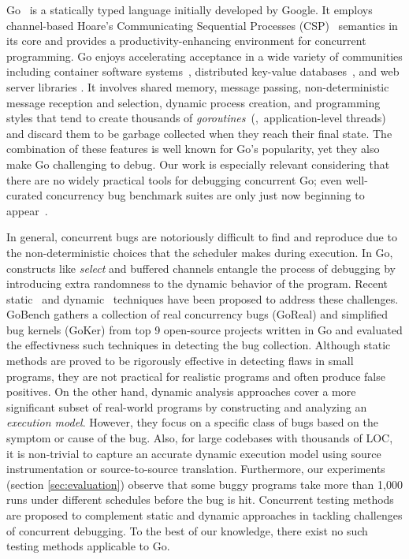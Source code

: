 Go~\cite{go} is a statically typed language initially developed by Google.
%
It employs channel-based Hoare's Communicating Sequential Processes (CSP)~\cite{hoare-csp78} semantics in its core and provides a productivity-enhancing environment for concurrent programming.
%
Go enjoys accelerating acceptance in a wide variety of
communities including container software systems~\cite{merkel2014docker,kubernetes},  distributed key-value databases~\cite{etcd,cockroachdb-sigmod20}, and web server libraries \cite{grpc}.
%
It involves shared memory, message passing, non-deterministic message reception and selection, dynamic process creation, and programming styles that tend to create thousands of \textit{goroutines}~(\ie,~application-level threads) and discard them to be garbage collected when they reach their final state.
%
The combination of these features is well known for Go's popularity, yet they also make Go challenging to debug.
%
Our work is especially relevant considering that there are no widely practical tools for debugging concurrent Go; even well-curated
concurrency bug benchmark suites are only just now beginning to appear~\cite{tu-concurrentBugs-asplos19,yuan-gobench-cgo21}.
%

In general, concurrent bugs are notoriously difficult to find and reproduce due to the non-deterministic choices that the scheduler makes during execution.
%
In Go, constructs like \textit{select} and buffered channels entangle the process of debugging by introducing extra randomness to the dynamic behavior of the program.
%
Recent static~\cite{ng-dl-cc16,stadtmuller-minigo-aplas16,lange-fence-popl17,lange-staticType-icse18} and dynamic~\cite{go-race-blog,zhao-occam97,sulzmann-corr17,sulzmann-twophase-2018,dilley-gomela-corr2020} techniques have been proposed to address these challenges.
%
GoBench \cite{yuan-gobench-cgo21} gathers a collection of real concurrency bugs (GoReal) and simplified bug kernels (GoKer) from top 9 open-source projects written in Go and evaluated the effectivness such techniques in detecting the bug collection.
%
Although static methods are proved to be rigorously effective in detecting flaws in small programs, they are not practical for realistic programs and often produce false positives.
%
On the other hand, dynamic analysis approaches cover a more significant subset of real-world programs by constructing and analyzing an \textit{execution model}.
%
However, they focus on a specific class of bugs based on the symptom or cause of the bug.
%
Also, for large codebases with thousands of LOC, it is non-trivial to capture an accurate dynamic execution model using source instrumentation or source-to-source translation.
%
Furthermore, our experiments (section \ref{sec:evaluation}) observe that some buggy programs take more than 1,000 runs under different schedules before the bug is hit.
%
Concurrent testing methods~\cite{arora-concrrentTesting-16} are proposed to complement static and dynamic approaches in tackling challenges of concurrent debugging.
%
To the best of our knowledge, there exist no such testing methods applicable to Go.
%

